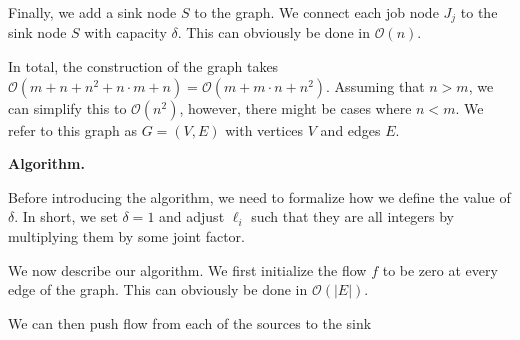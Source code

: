 \documentclass{article}
\begin{document}
Finally, we add a sink node $S$ to the graph. We connect each job node $J_j$ to the sink node $S$ with capacity $\delta$. This can obviously be done in $\mathcal{O}(n)$.

In total, the construction of the graph takes $\mathcal{O}(m + n + n^2 + n \cdot m + n) = \mathcal{O}(m + m \cdot n + n^2)$. Assuming that $n > m$, we can simplify this to $\mathcal{O}(n^2)$, however, there might be cases where $n < m$. We refer to this graph as $G=(V, E)$ with vertices $V$ and edges $E$.

\textbf{Algorithm.}

Before introducing the algorithm, we need to formalize how we define the value of $\delta$.
In short, we set $\delta = 1$ and adjust $\ell_i$ such that they are all integers by multiplying them by some joint factor.

We now describe our algorithm.
We first initialize the flow $f$ to be zero at every edge of the graph. This can obviously be done in $\mathcal{O}(|E|)$.

We can then push flow from each of the sources to the sink
\end{document}
